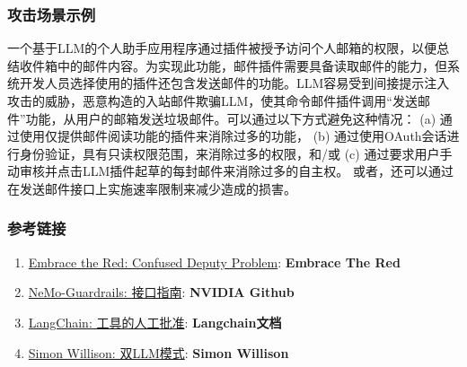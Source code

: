 \documentclass[
]{article}
\providecommand{\tightlist}{%
  \setlength{\itemsep}{0pt}\setlength{\parskip}{0pt}}
\begin{document}
\subsubsection{攻击场景示例}\label{ux653bux51fbux573aux666fux793aux4f8b}

一个基于LLM的个人助手应用程序通过插件被授予访问个人邮箱的权限，以便总结收件箱中的邮件内容。为实现此功能，邮件插件需要具备读取邮件的能力，但系统开发人员选择使用的插件还包含发送邮件的功能。LLM容易受到间接提示注入攻击的威胁，恶意构造的入站邮件欺骗LLM，使其命令邮件插件调用``发送邮件''功能，从用户的邮箱发送垃圾邮件。可以通过以下方式避免这种情况：
(a) 通过使用仅提供邮件阅读功能的插件来消除过多的功能， (b)
通过使用OAuth会话进行身份验证，具有只读权限范围，来消除过多的权限，和/或
(c) 通过要求用户手动审核并点击LLM插件起草的每封邮件来消除过多的自主权。
或者，还可以通过在发送邮件接口上实施速率限制来减少造成的损害。

\subsubsection{参考链接}\label{ux53c2ux8003ux94feux63a5}

\begin{enumerate}
\def\labelenumi{\arabic{enumi}.}
\tightlist
\item
  \href{https://embracethered.com/blog/posts/2023/chatgpt-cross-plugin-request-forgery-and-prompt-injection./}{Embrace
  the Red: Confused Deputy Problem}: \textbf{Embrace The Red}
\item
  \href{https://github.com/NVIDIA/NeMo-Guardrails/blob/main/docs/security/guidelines.md}{NeMo-Guardrails:
  接口指南}: \textbf{NVIDIA Github}
\item
  \href{https://python.langchain.com/docs/modules/agents/tools/how_to/human_approval}{LangChain:
  工具的人工批准}: \textbf{Langchain文档}
\item
  \href{https://simonwillison.net/2023/Apr/25/dual-llm-pattern/}{Simon
  Willison: 双LLM模式}: \textbf{Simon Willison}
\end{enumerate}
\end{document}
